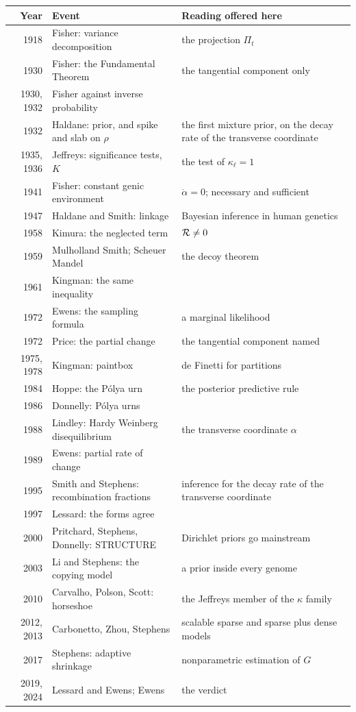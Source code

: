 \begin{center}
\small
\begin{tabularx}{\textwidth}{r>{\raggedright\arraybackslash}X>{\raggedright\arraybackslash}X}
\toprule
Year & Event & Reading offered here \\
\midrule
1918 & Fisher: variance decomposition & the projection $\Pi_t$ \\
1930 & Fisher: the Fundamental Theorem & the tangential component only \\
1930, 1932 & Fisher against inverse probability & \\
1932 & Haldane: prior, and spike and slab on $\rho$ & the first mixture prior, on the decay rate of the transverse coordinate \\
1935, 1936 & Jeffreys: significance tests, $K$ & the test of $\kappa_\ell=1$ \\
1941 & Fisher: constant genic environment & $\dot\alpha=0$; necessary and sufficient \\
1947 & Haldane and Smith: linkage & Bayesian inference in human genetics \\
1958 & Kimura: the neglected term & $\mathcal{R}\neq0$ \\
1959 & Mulholland Smith; Scheuer Mandel & the decoy theorem \\
1961 & Kingman: the same inequality & \\
1972 & Ewens: the sampling formula & a marginal likelihood \\
1972 & Price: the partial change & the tangential component named \\
1975, 1978 & Kingman: paintbox & de Finetti for partitions \\
1984 & Hoppe: the P\'olya urn & the posterior predictive rule \\
1986 & Donnelly: P\'olya urns & \\
1988 & Lindley: Hardy Weinberg disequilibrium & the transverse coordinate $\alpha$ \\
1989 & Ewens: partial rate of change & \\
1995 & Smith and Stephens: recombination fractions & inference for the decay rate of the transverse coordinate \\
1997 & Lessard: the forms agree & \\
2000 & Pritchard, Stephens, Donnelly: STRUCTURE & Dirichlet priors go mainstream \\
2003 & Li and Stephens: the copying model & a prior inside every genome \\
2010 & Carvalho, Polson, Scott: horseshoe & the Jeffreys member of the $\kappa$ family \\
2012, 2013 & Carbonetto, Zhou, Stephens & scalable sparse and sparse plus dense models \\
2017 & Stephens: adaptive shrinkage & nonparametric estimation of $G$ \\
2019, 2024 & Lessard and Ewens; Ewens & the verdict \\
\bottomrule
\end{tabularx}
\end{center}

